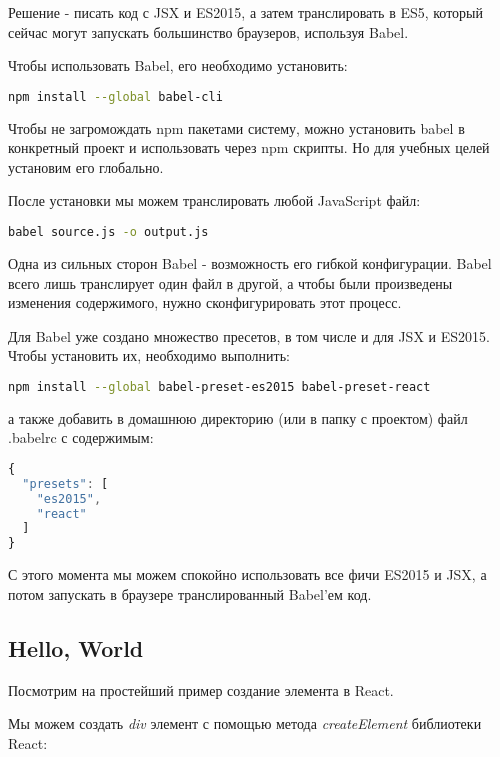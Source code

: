 Решение - писать код с JSX и ES2015, а затем транслировать в ES5, который сейчас могут запускать большинство браузеров, используя Babel.

Чтобы использовать Babel, его необходимо установить:

\begin{lstlisting}[language=bash]
	npm install --global babel-cli
\end{lstlisting}

Чтобы не загромождать npm пакетами систему, можно установить babel в конкретный проект и использовать через npm скрипты. Но для учебных целей установим его глобально.

После установки мы можем транслировать любой JavaScript файл:

\begin{lstlisting}[language=bash]
	babel source.js -o output.js
\end{lstlisting}

Одна из сильных сторон Babel - возможность его гибкой конфигурации. Babel всего лишь транслирует один файл в другой, а чтобы были произведены изменения содержимого, нужно сконфигурировать этот процесс.

Для Babel уже создано множество пресетов, в том числе и для JSX и ES2015. Чтобы установить их, необходимо выполнить:

\begin{lstlisting}[language=bash]
npm install --global babel-preset-es2015 babel-preset-react	
\end{lstlisting}

а также добавить в домашнюю директорию (или в папку с проектом) файл .babelrc с содержимым:

\begin{lstlisting}[language=JavaScript]
{
  "presets": [
    "es2015",
    "react" 
  ]
}

\end{lstlisting}

С этого момента мы можем спокойно использовать все фичи ES2015 и JSX, а потом запускать в браузере транслированный Babel'ем код.

\subsection*{Hello, World}

Посмотрим на простейший пример создание элемента в React. 

Мы можем создать \textit{div} элемент с помощью метода \textit{createElement} библиотеки React:

